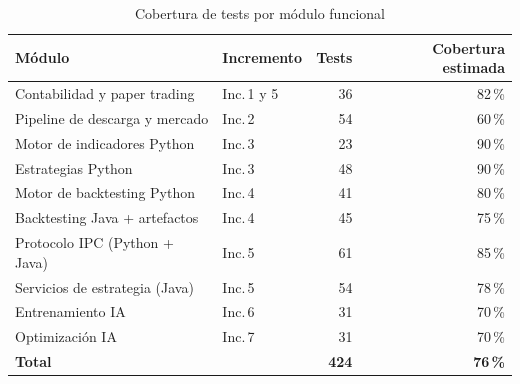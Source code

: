 \begin{table}[H]
    \centering
    \caption{Cobertura de tests por módulo funcional}
    \label{tab:test_coverage}
    \begin{tabular}{p{4.8cm} p{2.8cm} r r}
    \hline
    \textbf{Módulo} & \textbf{Incremento} & \textbf{Tests} & \textbf{Cobertura estimada} \\
    \hline
    Contabilidad y paper trading & Inc.\,1 y 5 & 36 & 82\,\% \\
    Pipeline de descarga y mercado & Inc.\,2 & 54 & 60\,\% \\
    Motor de indicadores Python & Inc.\,3 & 23 & 90\,\% \\
    Estrategias Python & Inc.\,3 & 48 & 90\,\% \\
    Motor de backtesting Python & Inc.\,4 & 41 & 80\,\% \\
    Backtesting Java + artefactos & Inc.\,4 & 45 & 75\,\% \\
    Protocolo IPC (Python + Java) & Inc.\,5 & 61 & 85\,\% \\
    Servicios de estrategia (Java) & Inc.\,5 & 54 & 78\,\% \\
    Entrenamiento IA & Inc.\,6 & 31 & 70\,\% \\
    Optimización IA & Inc.\,7 & 31 & 70\,\% \\
    \hline
    \textbf{Total} & & \textbf{424} & \textbf{76\,\%} \\
    \hline
    \end{tabular}
\end{table}


